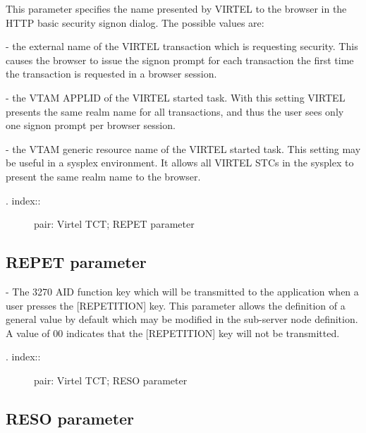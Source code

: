 \documentclass[letterpaper,10pt,english]{sphinxmanual}
\begin{document}
This parameter specifies the name presented by VIRTEL to the browser in the HTTP basic security signon dialog. The possible values are:

 - the external name of the VIRTEL transaction which is requesting security. This causes the browser to issue the signon prompt for each transaction the first time the transaction is requested in a browser session.

 - the VTAM APPLID of the VIRTEL started task. With this setting VIRTEL presents the same realm name for all transactions, and thus the user sees only one signon prompt per browser session.

 - the VTAM generic resource name of the VIRTEL started task. This setting may be useful in a sysplex environment. It allows all VIRTEL STCs in the sysplex to present the same realm name to the browser.
\begin{description}
\item[{. index::}] \leavevmode
pair: Virtel TCT; REPET parameter

\end{description}


\subsection{REPET parameter}
\label{\detokenize{Installation_Guide:repet-parameter}}
\begin{sphinxVerbatim}[commandchars=\\\{\}]
  
\end{sphinxVerbatim}

 - The 3270 AID function key which will be transmitted to the application when a user presses the {[}REPETITION{]} key. This parameter allows the definition of a general value by default which may be modified in the sub-server node definition. A value of 00 indicates that the {[}REPETITION{]} key will not be transmitted.
\begin{description}
\item[{. index::}] \leavevmode
pair: Virtel TCT; RESO parameter

\end{description}


\subsection{RESO parameter}
\label{\detokenize{Installation_Guide:reso-parameter}}
\begin{sphinxVerbatim}[commandchars=\\\{\}]
 
\end{sphinxVerbatim}
\end{document}
